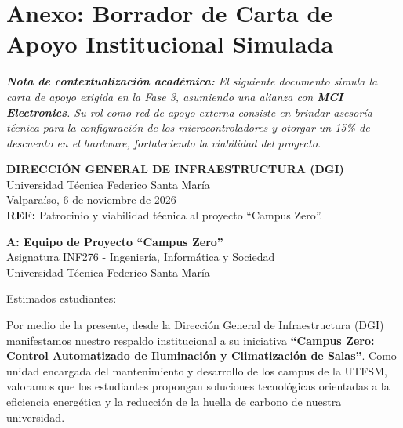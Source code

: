 
\section{Anexo: Borrador de Carta de Apoyo Institucional Simulada}
\label{sec:carta_apoyo}

\noindent
\textit{\small \textbf{Nota de contextualización académica:} El siguiente documento simula la carta de apoyo exigida en la Fase 3, asumiendo una alianza con \textbf{MCI Electronics}. Su rol como red de apoyo externa consiste en brindar asesoría técnica para la configuración de los microcontroladores y otorgar un 15\% de descuento en el hardware, fortaleciendo la viabilidad del proyecto.}

\vspace{0.8em}

\vspace{1cm}

\begin{flushright}
\textbf{DIRECCIÓN GENERAL DE INFRAESTRUCTURA (DGI)}\\
Universidad Técnica Federico Santa María\\
Valparaíso, 6 de noviembre de 2026\\
\vspace{0.5cm}
\textbf{REF:} Patrocinio y viabilidad técnica al proyecto ``Campus Zero''.
\end{flushright}

\vspace{1cm}

\noindent
\textbf{A: Equipo de Proyecto ``Campus Zero''}\\
Asignatura INF276 - Ingeniería, Informática y Sociedad\\
Universidad Técnica Federico Santa María

\vspace{1cm}

\noindent Estimados estudiantes:

\vspace{0.5cm}

\noindent Por medio de la presente, desde la Dirección General de Infraestructura (DGI) manifestamos nuestro respaldo institucional a su iniciativa \textbf{``Campus Zero: Control Automatizado de Iluminación y Climatización de Salas''}. Como unidad encargada del mantenimiento y desarrollo de los campus de la UTFSM, valoramos que los estudiantes propongan soluciones tecnológicas orientadas a la eficiencia energética y la reducción de la huella de carbono de nuestra universidad.

